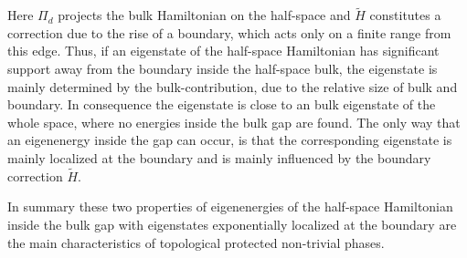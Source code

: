 Here $\Pi_d$ projects the bulk Hamiltonian on the half-space and $\tilde{H}$ constitutes a correction due to the rise of a boundary, which acts only on a finite range from this edge. Thus, if an eigenstate of the half-space Hamiltonian has significant support away from the boundary inside the half-space bulk, the eigenstate is mainly determined by the bulk-contribution, due to the relative size of bulk and boundary. In consequence the eigenstate is close to an bulk eigenstate of the whole space, where no energies inside the bulk gap are found. The only way that an eigenenergy inside the gap can occur, is that the corresponding eigenstate is mainly localized at the boundary and is mainly influenced by the boundary correction $\tilde{H}$.

In summary these two properties of eigenenergies of the half-space Hamiltonian inside the bulk gap with eigenstates exponentially localized at the boundary are the main characteristics of topological protected non-trivial phases.

